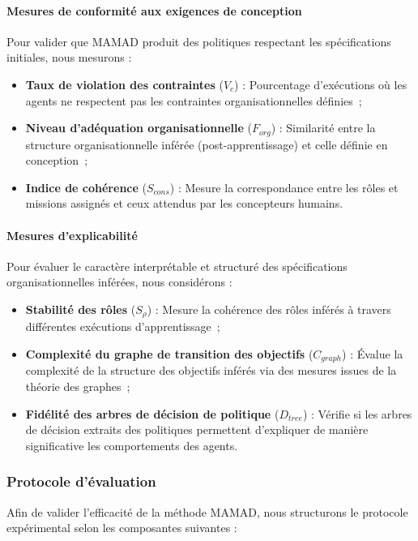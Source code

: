 \paragraph{Mesures de conformité aux exigences de conception}
Pour valider que MAMAD produit des politiques respectant les spécifications initiales, nous mesurons :
\begin{itemize}
    \item \textbf{Taux de violation des contraintes} ($V_c$) : Pourcentage d'exécutions où les agents ne respectent pas les contraintes organisationnelles définies~;
    \item \textbf{Niveau d'adéquation organisationnelle} ($F_{org}$) : Similarité entre la structure organisationnelle inférée (post-apprentissage) et celle définie en conception~;
    \item \textbf{Indice de cohérence} ($S_{cons}$) : Mesure la correspondance entre les rôles et missions assignés et ceux attendus par les concepteurs humains.
\end{itemize}

\paragraph{Mesures d'explicabilité}
Pour évaluer le caractère interprétable et structuré des spécifications organisationnelles inférées, nous considérons :
\begin{itemize}
    \item \textbf{Stabilité des rôles} ($S_{\rho}$) : Mesure la cohérence des rôles inférés à travers différentes exécutions d'apprentissage~;
    \item \textbf{Complexité du graphe de transition des objectifs} ($C_{graph}$) : Évalue la complexité de la structure des objectifs inférés via des mesures issues de la théorie des graphes~;
    \item \textbf{Fidélité des arbres de décision de politique} ($D_{tree}$) : Vérifie si les arbres de décision extraits des politiques permettent d'expliquer de manière significative les comportements des agents.
\end{itemize}

\subsubsection{Protocole d'évaluation}

Afin de valider l'efficacité de la méthode MAMAD, nous structurons le protocole expérimental selon les composantes suivantes :


